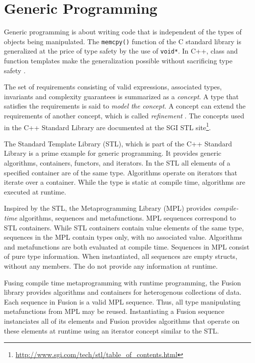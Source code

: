 \section{Generic Programming}

Generic programming is about writing code that is independent of the types of
objects being manipulated. The \texttt{memcpy()} function of the C standard
library is generalized at the price of type safety by the use of \texttt{void*}.
In C++, class and function templates make the generalization possible without
sacrificing type safety
\cite{Alexandrescu:2001:MCD:377789,Meyers:2005:ECS:1051335}.

The set of requirements consisting of valid expressions, associated types,
invariants and complexity guarantees is summarized as a \emph{concept}. A type
that satisfies the requirements is said to \emph{model the concept}. A concept
can extend the requirements of another concept, which is called
\emph{refinement} \cite{gregor08:devx_concepts}. The concepts used in the C++
Standard Library are documented at the SGI STL
site\footnote{\url{http://www.sgi.com/tech/stl/table_of_contents.html}}.

The Standard Template Library (STL), which is part of the C++ Standard Library
is a prime example for generic programming. It provides generic algorithms,
containers, functors, and iterators. In the STL all elements of a specified
container are of the same type. Algorithms operate on iterators that iterate
over a container. While the type is static at compile time, algorithms are
executed at runtime.

Inspired by the STL, the Metaprogramming Library (MPL) provides
\emph{compile-time} algorithms, sequences and metafunctions. MPL sequences
correspond to STL containers. While STL containers contain value elements of the
same type, sequences in the MPL contain types only, with no associated value.
Algorithms and metafunctions are both evaluated at compile time. Sequences in
MPL consist of pure type information. When instantiated, all sequences are empty
structs, without any members. The do not provide any information at runtime.

Fusing compile time metaprogramming with runtime programming, the Fusion library
provides algorithms and containers for heterogenous collections of data. Each
sequence in Fusion is a valid MPL sequence. Thus, all type manipulating
metafunctions from MPL may be reused. Instantiating a Fusion sequence
instanciates all of its elements and Fusion provides algorithms that operate on
these elements at runtime using an iterator concept similar to the STL.

